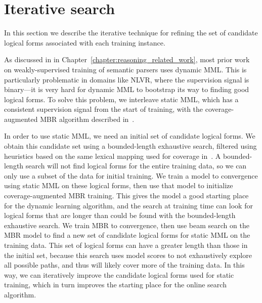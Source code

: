\section{Iterative search} \label{sec:iterative_search} In this section we
describe the iterative technique for refining the set of candidate logical
forms associated with each training instance.

As discussed in  in Chapter~\ref{chapter:reasoning_related_work},
most prior work on
weakly-supervised training of semantic parsers uses dynamic MML.  This is
particularly problematic in domains like NLVR, where the supervision signal is
binary---it is very hard for dynamic MML to bootstrap its way to finding good
logical forms.  To solve this problem, we interleave static MML, which has a
consistent supervision signal from the start of training, with the
coverage-augmented MBR algorithm described
in~.

In order to use static MML, we need an initial set of candidate logical forms.
We obtain this candidate set using a bounded-length exhaustive search, filtered
using heuristics based on the same lexical mapping used for coverage
in~.  A bounded-length search will not find
logical forms for the entire training data, so we can only use a subset of the
data for initial training.  We train a model to convergence using static MML on
these logical forms, then use that model to initialize coverage-augmented MBR
training.  This gives the model a good starting place for the dynamic learning
algorithm, and the search at training time can look for logical forms that are
longer than could be found with the bounded-length exhaustive search.  We train
MBR to convergence, then use beam search on the MBR model to find a new set of
candidate logical forms for static MML on the training data.  This set of
logical forms can have a greater length than those in the initial set, because
this search uses model scores to not exhaustively explore all possible paths,
and thus will likely cover more of the training data.  In this way, we can
iteratively improve the candidate logical forms used for static training, which
in turn improves the starting place for the online search algorithm.

